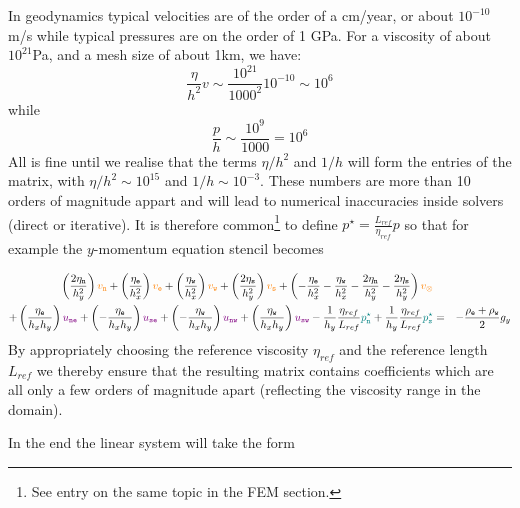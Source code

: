 In geodynamics typical velocities are of the order of a cm/year, or about 
$10^{-10}$ m/s
while typical pressures are on the order of 1 GPa.
For a viscosity of about $10^{21}$Pa, and a mesh size of about 1km, 
we have:
\[
\frac{\eta}{h^2} v \sim \frac{10^{21}}{1000^2} 10^{-10} \sim 10^6
\]
while
\[
\frac{p}{h} \sim \frac{10^9}{1000} = 10^6
\]
All is fine until we realise that the terms $\eta/h^2$ and $1/h$ 
will form the entries of the matrix, with 
$\eta/h^2 \sim 10^{15}$ and $1/h \sim 10^{-3}$. 
These numbers are more than 10 orders of magnitude appart and will lead to 
numerical inaccuracies inside solvers (direct or iterative). 
It is therefore common\footnote{See entry on the same topic
in the FEM section.} to define ${p}^\star=\frac{L_{ref}}{\eta_{ref}} p$ so that 
for example the $y$-momentum equation stencil becomes


\begin{eqnarray}
\left( \frac{2\eta_{\tt n}}{h_y^2} \right) {\color{orange} v_{\tt n}} +
\left( \frac{ \eta_{\tt e}}{h_x^2} \right) {\color{orange} v_{\tt e}} +
\left( \frac{ \eta_{\tt w}}{h_x^2} \right) {\color{orange} v_{\tt w}} +
\left( \frac{2\eta_{\tt s}}{h_y^2} \right) {\color{orange} v_{\tt s}} +
\left( 
-\frac{\eta_{\tt e}}{h_x^2} 
-\frac{\eta_{\tt w}}{h_x^2} 
-\frac{2\eta_{\tt n}}{h_y^2} 
-\frac{2\eta_{\tt s}}{h_y^2} 
\right) {\color{orange} v_\otimes} \nonumber\\
+
\left( \frac{\eta_{\tt e}}{h_x h_y} \right) {\color{violet} u_{\tt ne}} +
\left(-\frac{\eta_{\tt e}}{h_x h_y} \right) {\color{violet} u_{\tt se}} +
\left(-\frac{\eta_{\tt w}}{h_x h_y} \right) {\color{violet} u_{\tt nw}} +
\left( \frac{\eta_{\tt w}}{h_x h_y} \right) {\color{violet} u_{\tt sw}} 
-\frac{1}{h_y}\frac{\eta_{ref}}{L_{ref}} {\color{teal} {p}_{\tt n}^\star} 
+\frac{1}{h_y}\frac{\eta_{ref}}{L_{ref}} {\color{teal} {p}_{\tt s}^\star}
&=& -\frac{\rho_{\tt e}+\rho_{\tt w}}{2} g_y \nonumber
\end{eqnarray}
By appropriately choosing the reference viscosity $\eta_{ref}$ and the reference
length $L_{ref}$ we thereby ensure that the 
resulting matrix contains coefficients which are all only a 
few orders of magnitude apart (reflecting the viscosity range in the domain).

In the end the linear system will take the form 

